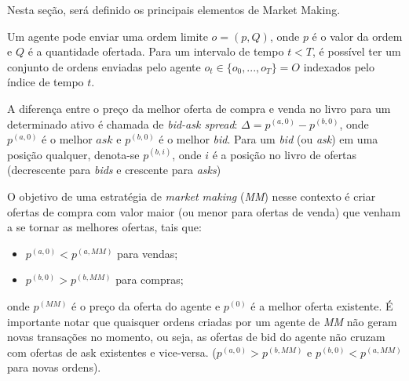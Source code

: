 Nesta seção, será definido os principais elementos de Market Making.

Um agente pode enviar uma ordem limite $o = (p, Q)$, onde $p$ é o valor da ordem e $Q$ é a quantidade ofertada. Para um intervalo de tempo $t < T$, é possível ter um conjunto de ordens enviadas pelo agente $o_{t} \in \{o_{0}, ..., o_{T}\} = O$ indexados pelo índice de tempo $t$.

A diferença entre o preço da melhor oferta de compra e venda no livro para um determinado ativo é chamada de \textit{bid-ask spread}: $\Delta = p^{(a, 0)} - p^{(b, 0)}$, onde $p^{(a, 0)}$ é o melhor $ask$ e $p^{(b, 0)}$ é o melhor \textit{bid}. Para um \textit{bid} (ou \textit{ask}) em uma posição qualquer, denota-se $p^{(b, i)}$, onde $i$ é a posição no livro de ofertas (decrescente para \textit{bids} e crescente para \textit{asks})

O objetivo de uma estratégia de \textit{market making} (\textit{MM}) nesse contexto é criar ofertas de compra com valor maior (ou menor para ofertas de venda) que venham a se tornar as melhores ofertas, tais que: 

\begin{itemize}
    \item $p^{(a, 0)} < p^{(a, MM)}$ para vendas;
    \item $p^{(b, 0)} > p^{(b, MM)}$ para compras;
\end{itemize}

onde $p^{(MM)}$ é o preço da oferta do agente e  $p^{(0)}$ é a melhor oferta existente.
É importante notar que quaisquer ordens criadas por um agente de \textit{MM} não geram novas transações no momento, ou seja, as ofertas de bid do agente não cruzam com ofertas de ask existentes e vice-versa. ($p^{(a, 0)} > p^{(b, MM)}$ e $p^{(b, 0)} < p^{(a, MM)}$ para novas ordens).

